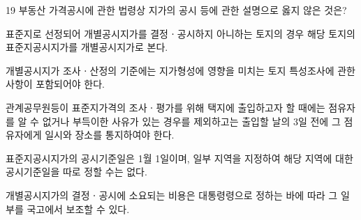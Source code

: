 \begin{question}{19}
부동산 가격공시에 관한 법령상 지가의 공시 등에 관한 설명으로 옳지 않은 것은?
\begin{choices}
  \item 표준지로 선정되어 개별공시지가를 결정ㆍ공시하지 아니하는 토지의 경우 해당 토지의 표준지공시지가를 개별공시지가로 본다.
  \item 개별공시지가 조사ㆍ산정의 기준에는 지가형성에 영향을 미치는 토지 특성조사에 관한 사항이 포함되어야 한다.
  \item 관계공무원등이 표준지가격의 조사ㆍ평가를 위해 택지에 출입하고자 할 때에는 점유자를 알 수 없거나 부득이한 사유가 있는 경우를 제외하고는 출입할 날의 3일 전에 그 점유자에게 일시와 장소를 통지하여야 한다.
  \item 표준지공시지가의 공시기준일은 1월 1일이며, 일부 지역을 지정하여 해당 지역에 대한 공시기준일을 따로 정할 수는 없다.
  \item 개별공시지가의 결정ㆍ공시에 소요되는 비용은 대통령령으로 정하는 바에 따라 그 일부를 국고에서 보조할 수 있다.
\end{choices}
\end{question}

